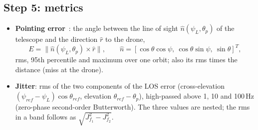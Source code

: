 \documentclass[10pt,a4paper]{article}
\numberwithin{equation}{section}
\begin{document}
\subsection{Step 5: metrics}
\begin{itemize}
\item \textbf{Pointing error}~\cite[eq.~5.23]{attorrese2026}: the angle between the line of sight $\hat n(\psi_L,\theta_p)$ of the telescope and the direction $\hat r$ to the drone,
\begin{equation}
E=\bigl\lVert\hat n(\psi_L,\theta_p)\times\hat r\bigr\rVert,\qquad \hat n=[\cos\theta\cos\psi,\ \cos\theta\sin\psi,\ \sin\theta]^T,
\end{equation}
rms, 95th percentile and maximum over one orbit; also its rms times the distance (miss at the drone).
\item \textbf{Jitter}: rms of the two components of the LOS error (cross-elevation $(\psi_{ref}-\psi_L)\cos\theta_{ref}$, elevation $\theta_{ref}-\theta_p$), high-passed above 1, 10 and 100\,Hz (zero-phase second-order Butterworth). The three values are nested; the rms in a band follows as $\sqrt{J_{f_1}^2-J_{f_2}^2}$.
\end{itemize}
\end{document}
